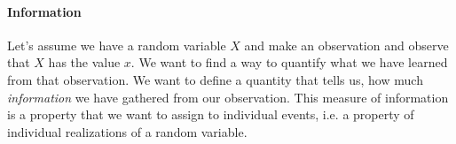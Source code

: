 \paragraph{Information}
Let's assume we have a random variable $X$ and make an observation and observe that $X$ has the value $x$. We want to find a way to quantify what we have learned from that observation. We want to define a quantity that tells us, how much \emph{information} we have gathered from our observation. This measure of information is a property that we want to assign to individual events, i.e. a property of individual realizations of a random variable.





% 



% 

% 

